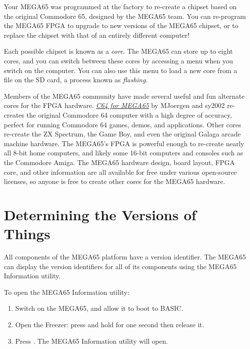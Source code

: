 Your MEGA65 was programmed at the factory to re-create a chipset based on the original Commodore 65, designed by the MEGA65 team. You can re-program the MEGA65 FPGA to upgrade to new versions of the MEGA65 chipset, or to replace the chipset with that of an entirely different computer!

Each possible chipset is known as a {\em core}. The MEGA65 can store up to eight cores, and you can switch between these cores by accessing a menu when you switch on the computer. You can also use this menu to load a new core from a file on the SD card, a process known as {\em flashing}.

Members of the MEGA65 community have made several useful and fun alternate cores for the FPGA hardware. \href{https://github.com/MJoergen/C64MEGA65}{{\em C64 for MEGA65}} by MJoergen and sy2002 re-creates the original Commodore 64 computer with a high degree of accuracy, perfect for running Commodore 64 games, demos, and applications. Other cores re-create the ZX Spectrum, the Game Boy, and even the original Galaga arcade machine hardware. The MEGA65's FPGA is powerful enough to re-create nearly all 8-bit home computers, and likely some 16-bit computers and consoles such as the Commodore Amiga. The MEGA65 hardware design, board layout, FPGA core, and other information are all available for free under various open-source licenses, so anyone is free to create other cores for the MEGA65 hardware.

\section{Determining the Versions of Things}
\label{sec:versions}

All components of the MEGA65 platform have a version identifier. The MEGA65 can display the version identifiers for all of its components using the MEGA65 Information utility.

To open the MEGA65 Information utility:

\begin{enumerate}
  \item Switch on the MEGA65, and allow it to boot to BASIC.
  \item Open the Freezer: press and hold  for one second then release it.
  \item Press . The MEGA65 Information utility will open.
\end{enumerate}

